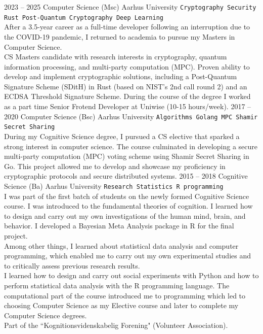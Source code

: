 \documentclass[9pt]{developercv} %
\begin{document}
\begin{entrylist}
	\entry
		{2023 -- 2025}
		{Computer Science (Msc)}
		{Aarhus University}
		{
			\texttt{Cryptography \slashsep Security \slashsep Rust \slashsep Post-Quantum Cryptography \slashsep Deep Learning}\\

			After a 3.5-year career as a full-time developer following an interruption due to the COVID-19 pandemic, I returned to academia to pursue my Masters in Computer Science.\\

			CS Masters candidate with research interests in cryptography, quantum information processing, and multi-party computation (MPC). Proven ability to develop and implement cryptographic solutions, including a Post-Quantum Signature Scheme (SDitH) in Rust (based on NIST's 2nd call round 2) and an ECDSA Threshold Signature Scheme. During the course of the degree I worked as a part time Senior Frotend Developer at Uniwise (10-15 hours/week).
		}
	\entry
		{2017 -- 2020}
		{Computer Science (Bsc)}
		{Aarhus University}
		{
			\texttt{Algorithms \slashsep Golang \slashsep MPC \slashsep Shamir Secret Sharing}\\

			During my Cognitive Science degree, I pursued a CS elective that sparked a strong interest in computer science. The course culminated in developing a secure multi-party computation (MPC) voting scheme using Shamir Secret Sharing in Go. This project allowed me to develop and showcase my proficiency in cryptographic protocols and secure distributed systems.
		}
	\entry
		{2015 -- 2018} 
		{Cognitive Science (Ba)}
		{Aarhus University}
		{
			\texttt{Research \slashsep Statistics \slashsep R programming}\\

			I was part of the first batch of students on the newly formed Cognitive Science course. I was introduced to the fundamental theories of cognition. I learned how to design and carry out my own investigations of the human mind, brain, and behavior. I developed a Bayesian Meta Analysis package in R for the final project.\\

			Among other things, I learned about statistical data analysis and computer programming, which enabled me to carry out my own experimental studies and to critically assess previous research results.\\

			I learned how to design and carry out social experiments with Python and how to perform statistical data analysis with the R programming language. The computational part of the course introduced me to programming which led to choosing Computer Science as my Elective course and later to complete my Computer Science degrees.\\

			Part of the “Kognitionsvidenskabelig Forening" (Volunteer Association).
		}
\end{entrylist}
\end{document}
